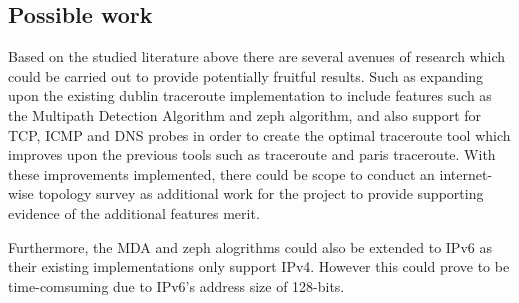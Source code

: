 
\subsection{Possible work}
Based on the studied literature above there are several avenues of research which could be carried out to provide potentially fruitful results. Such as expanding upon the existing dublin traceroute implementation to include features such as the Multipath Detection Algorithm and zeph algorithm, and also support for TCP, ICMP and DNS probes in order to create the optimal traceroute tool which improves upon the previous tools such as traceroute and paris traceroute. With these improvements implemented, there could be scope to conduct an internet-wise topology survey as additional work for the project to provide supporting evidence of the additional features merit. 

Furthermore, the MDA and zeph alogrithms could also be extended to IPv6 as their existing implementations only support IPv4. However this could prove to be time-comsuming due to IPv6's address size of 128-bits. 

\newpage



